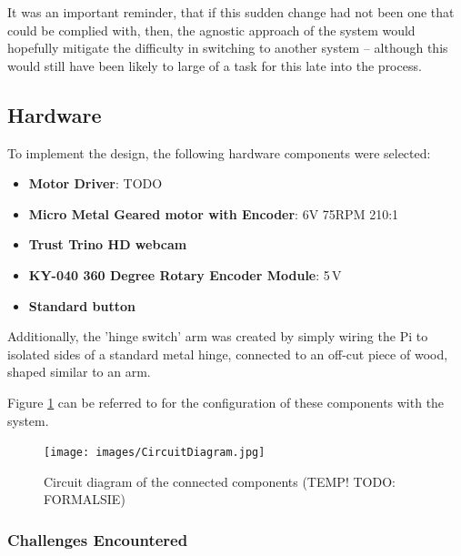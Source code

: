                 It was an important reminder, that if this sudden change had not been one that could be complied with, then, the agnostic approach of the system would hopefully mitigate the difficulty in switching to another system -- although this would still have been likely to large of a task for this late into the process.
    
        \subsection{Hardware}
    
            To implement the design, the following hardware components were selected:
    
            \begin{itemize}
                \item \textbf{Motor Driver}: TODO
                \item \textbf{Micro Metal Geared motor with Encoder}: 6V 75RPM 210:1
                \item \textbf{Trust Trino HD webcam}
                \item \textbf{KY-040 360 Degree Rotary Encoder Module}: 5\,V
                \item \textbf{Standard button}
            \end{itemize}
    
            Additionally, the 'hinge switch' arm was created by simply wiring the Pi to isolated sides of a standard metal hinge, connected to an off-cut piece of wood, shaped similar to an arm.
    
            Figure \ref{fig:circuitDiagram} can be referred to for the configuration of these components with the system.
    
            \begin{figure}
                \centering
                \texttt{[image: images/CircuitDiagram.jpg]}
                \caption{Circuit diagram of the connected components (TEMP! TODO: FORMALSIE)}
                \label{fig:circuitDiagram}
            \end{figure}
        
            \subsubsection{Challenges Encountered}
    
